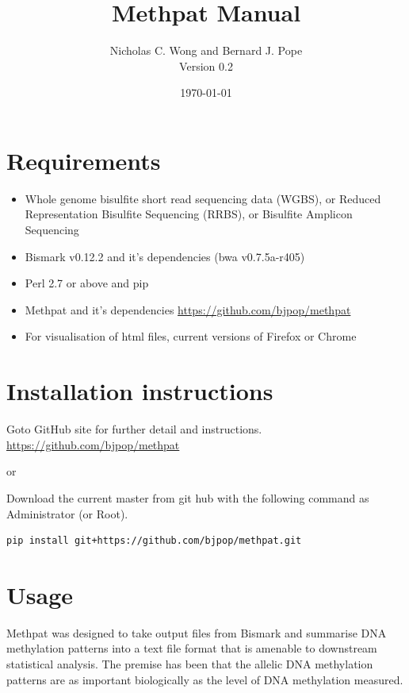 \documentclass[11pt,a4paper]{article}
\title{Methpat Manual}
\author{Nicholas C. Wong and Bernard J. Pope\\
		Version 0.2 \\
}
\date{\today}                              %
\begin{document}
\maketitle

\tableofcontents

\newpage

\section{Requirements}
\begin{itemize}
\item{Whole genome bisulfite short read sequencing data (WGBS), or Reduced Representation Bisulfite Sequencing (RRBS), or Bisulfite Amplicon Sequencing}
\item{Bismark v0.12.2 and it's dependencies (bwa  v0.7.5a-r405)}
\item{Perl 2.7 or above and pip}
\item{Methpat and it's dependencies \href{https://github.com/bjpop/methpat}{https://github.com/bjpop/methpat}}
\item{For visualisation of html files, current versions of Firefox or Chrome}
\end{itemize}

\section{Installation instructions}
Goto GitHub site for further detail and instructions. \href{https://github.com/bjpop/methpat}{https://github.com/bjpop/methpat}

or

Download the current master from git hub with the following command as Administrator (or Root).
\begin{verbatim}
pip install git+https://github.com/bjpop/methpat.git
\end{verbatim}

\section{Usage}
Methpat was designed to take output files from Bismark and summarise DNA methylation patterns into a text file format that is amenable to downstream statistical analysis.
The premise has been that the allelic DNA methylation patterns are as important biologically as the level of DNA methylation measured. 
\end{document}
